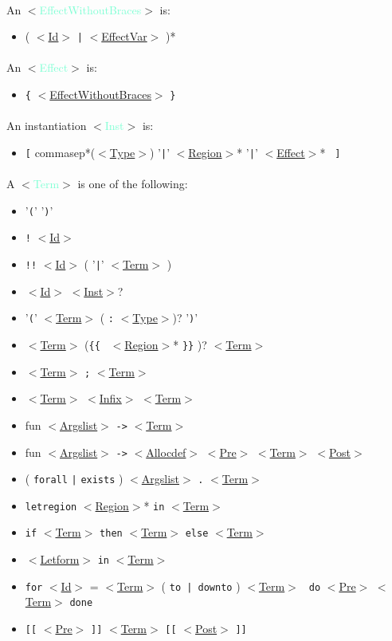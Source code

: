 \documentclass[a4paper]{scrreprt}
\newcommand{\cat}[1]{$<$\hyperref[#1]{#1}$>$}
\newcommand{\likecat}[1]{$<$\textcolor{Aquamarine}{#1}$>$}
\newcommand{\catdef}[1]{\label{#1}\likecat{#1}}
\begin{document}
\paragraph{}
An \catdef{EffectWithoutBraces} is:
\begin{itemize}
  \item ( \cat{Id} {\tt |} \cat{EffectVar} )*
\end{itemize}

\paragraph{}
An \catdef{Effect} is:
\begin{itemize}
  \item {\tt \{} \cat{EffectWithoutBraces} {\tt \}}
\end{itemize}

\paragraph{}
An instantiation \catdef{Inst} is:
\begin{itemize}
  \item {\tt [} commasep*(\cat{Type}) '{\tt |}' \cat{Region}* '{\tt |}' \cat{Effect}* {\tt
    ]}
\end{itemize}

\paragraph{}
A \catdef{Term} is one of the following:
\begin{itemize}
  \item '{\tt (}' '{\tt )}'
  \item {\tt !} \cat{Id}
  \item {\tt !!} \cat{Id} ( '{\tt |}' \cat{Term} )
  \item \cat{Id} \cat{Inst}?
  \item '{\tt (}' \cat{Term} ( {\tt :} \cat{Type})? '{\tt )}'
  \item \cat{Term} ({\tt \{\{ } \cat{Region}* {\tt \}\}} )? \cat{Term}
  \item \cat{Term} {\tt ;} \cat{Term}
  \item \cat{Term} \cat{Infix} \cat{Term}
  \item fun \cat{Argslist} {\tt ->} \cat{Term}
  \item fun \cat{Argslist} {\tt ->} \cat{Allocdef} {\cat{Pre}} \cat{Term} {\cat{Post}}
  \item ( {\tt forall} {\tt |} {\tt exists} ) \cat{Argslist} {\tt .} \cat{Term}
  \item {\tt letregion} \cat{Region}* {\tt in} \cat{Term}
  \item {\tt if} \cat{Term} {\tt then} \cat{Term} {\tt else} \cat{Term}
  \item \cat{Letform} {\tt in} \cat{Term}
  \item {\tt for} \cat{Id} = \cat{Term} ( {\tt to | downto} ) \cat{Term} {\tt
    do} {\cat{Pre}} \cat{Term} {\tt done}
  \item {\tt [[} \cat{Pre} {\tt ]]} \cat{Term} {\tt [[} \cat{Post} {\tt ]]}
\end{itemize}
\end{document}

